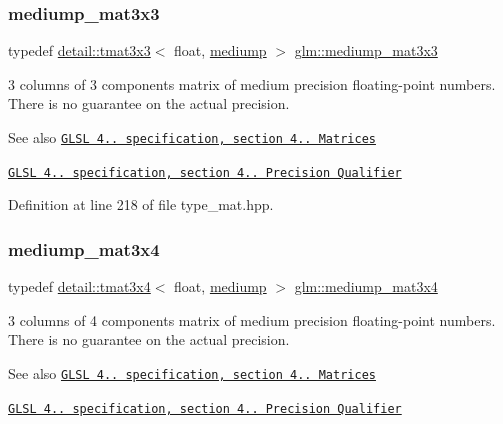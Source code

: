 \subsubsection{\texorpdfstring{mediump\+\_\+mat3x3}{mediump\_mat3x3}}
{\footnotesize\ttfamily typedef \hyperlink{structglm_1_1detail_1_1tmat3x3}{detail\+::tmat3x3}$<$ float, \hyperlink{namespaceglm_a0f04f086094c747d227af4425893f545a6416f3ea0c9025fb21ed50c4d6620482}{mediump} $>$ \hyperlink{group__core__precision_gae4c7f0d5d3dab712f9a671183e63e5ab}{glm\+::mediump\+\_\+mat3x3}}

3 columns of 3 components matrix of medium precision floating-\/point numbers. There is no guarantee on the actual precision.

\begin{DoxySeeAlso}{See also}
\href{http://www.opengl.org/registry/doc/GLSLangSpec.4.20.8.pdf}{\tt G\+L\+SL 4.. specification, section 4.. Matrices} 

\href{http://www.opengl.org/registry/doc/GLSLangSpec.4.20.8.pdf}{\tt G\+L\+SL 4.. specification, section 4.. Precision Qualifier} 
\end{DoxySeeAlso}


Definition at line 218 of file type\+\_\+mat.\+hpp.

\mbox{\label{group__core__precision_ga5654236019c6a732844da31534a3cf28}} 
\subsubsection{\texorpdfstring{mediump\+\_\+mat3x4}{mediump\_mat3x4}}
{\footnotesize\ttfamily typedef \hyperlink{structglm_1_1detail_1_1tmat3x4}{detail\+::tmat3x4}$<$ float, \hyperlink{namespaceglm_a0f04f086094c747d227af4425893f545a6416f3ea0c9025fb21ed50c4d6620482}{mediump} $>$ \hyperlink{group__core__precision_ga5654236019c6a732844da31534a3cf28}{glm\+::mediump\+\_\+mat3x4}}

3 columns of 4 components matrix of medium precision floating-\/point numbers. There is no guarantee on the actual precision.

\begin{DoxySeeAlso}{See also}
\href{http://www.opengl.org/registry/doc/GLSLangSpec.4.20.8.pdf}{\tt G\+L\+SL 4.. specification, section 4.. Matrices} 

\href{http://www.opengl.org/registry/doc/GLSLangSpec.4.20.8.pdf}{\tt G\+L\+SL 4.. specification, section 4.. Precision Qualifier} 
\end{DoxySeeAlso}


